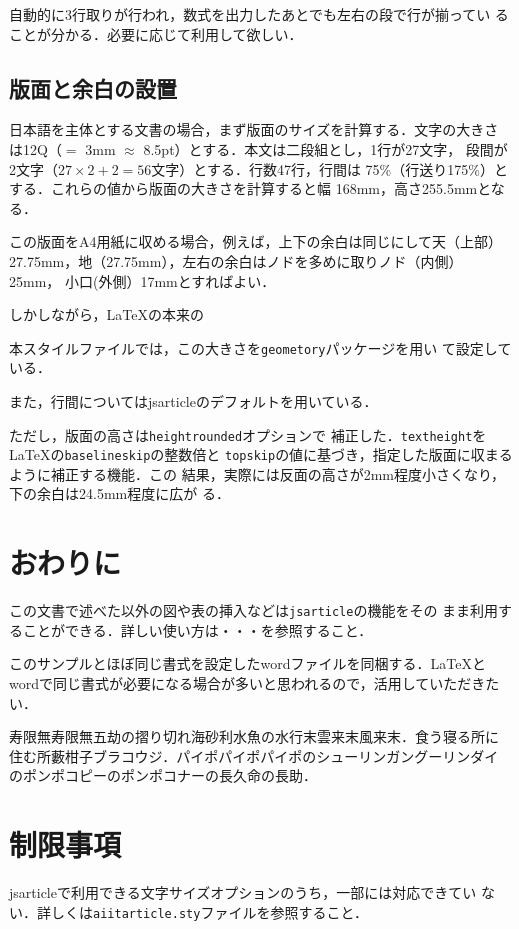 \documentclass[a4j, 12Q, twocolumn, twoside]{jsarticle}
\newcommand{\cmd}[1]{\texttt{\symbol{"5C}#1}} %
\begin{document}

自動的に3行取りが行われ，数式を出力したあとでも左右の段で行が揃ってい
ることが分かる．必要に応じて利用して欲しい．

\subsection{版面と余白の設置}
日本語を主体とする文書の場合，まず版面のサイズを計算する．文字の大きさ
は12Q（$=$ 3mm $\approx$ 8.5pt）とする．本文は二段組とし，1行が27文字，
段間が2文字（$27 \times 2 + 2 = 56$文字）とする．行数47行，行間は
75\%（行送り175\%）とする．これらの値から版面の大きさを計算すると幅
168mm，高さ255.5mmとなる．

この版面をA4用紙に収める場合，例えば，上下の余白は同じにして天（上部）
27.75mm，地（27.75mm），左右の余白はノドを多めに取りノド（内側）25mm，
小口(外側）17mmとすればよい．

しかしながら，\LaTeX の本来の

本スタイルファイルでは，この大きさを\texttt{geometory}パッケージを用い
て設定している．

また，行間についてはjsarticleのデフォルトを用いている．

ただし，版面の高さは\texttt{heightrounded}オプションで
補正した．\cmd{textheight}を\LaTeX の\cmd{baselineskip}の整数倍と
\cmd{topskip}の値に基づき，指定した版面に収まるように補正する機能．この
結果，実際には反面の高さが2mm程度小さくなり，下の余白は24.5mm程度に広が
る．

\section{おわりに}
この文書で述べた以外の図や表の挿入などは\texttt{jsarticle}の機能をその
まま利用することができる．詳しい使い方は・・・を参照すること．

このサンプルとほぼ同じ書式を設定したwordファイルを同梱する．\LaTeX と
wordで同じ書式が必要になる場合が多いと思われるので，活用していただきた
い．

寿限無寿限無五劫の摺り切れ海砂利水魚の水行末雲来末風来末．食う寝る所に
住む所藪柑子ブラコウジ．パイポパイポパイポのシューリンガングーリンダイ
のポンポコピーのポンポコナーの長久命の長助．

\section{制限事項}
jsarticleで利用できる文字サイズオプションのうち，一部には対応できてい
ない．詳しくは\texttt{aiitarticle.sty}ファイルを参照すること．
\end{document}

